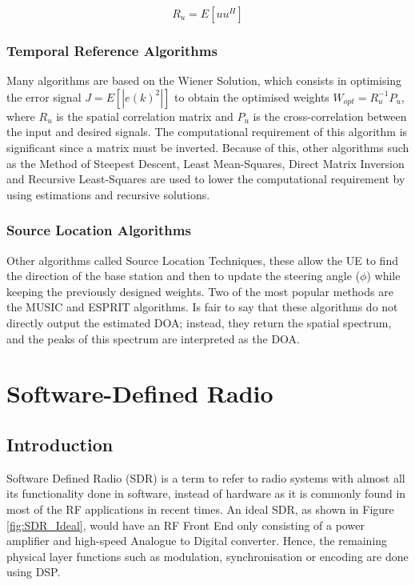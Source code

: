 \documentclass[12pt,a4paper]{report}
\begin{document}
\begin{equation}
    \label{adpt:scm}
    R_{u} = E[uu^{H}]
\end{equation}

\subsubsection{Temporal Reference Algorithms} \label{back:bf:adapt:tr}
Many algorithms are based on the Wiener Solution, which consists in optimising the error signal $J = E[|e(k)^{2}|]$ to obtain the optimised weights $W_{opt}=R_{u}^{-1}P_{u}$, where $R_{u}$ is the spatial correlation matrix and $P_{u}$ is the cross-correlation between the input and desired signals. The computational requirement of this algorithm is significant since a matrix must be inverted. Because of this, other algorithms such as the Method of Steepest Descent, Least Mean-Squares, Direct Matrix Inversion and Recursive Least-Squares are used to lower the computational requirement by using estimations and recursive solutions. \cite{Allen2005}

\subsubsection{Source Location Algorithms} \label{back:bf:adapt:sl}
Other algorithms called Source Location Techniques, these allow the UE to find the direction of the base station and then to update the steering angle ($\phi$) while keeping the previously designed weights. Two of the most popular methods are the MUSIC and ESPRIT algorithms. Is fair to say that these algorithms do not directly output the estimated DOA; instead, they return the spatial spectrum, and the peaks of this spectrum are interpreted as the DOA. \cite{Allen2005}


\newpage
\section{Software-Defined Radio} \label{back:sdr}
\subsection{Introduction} \label{back:sdr:intro}
Software Defined Radio (SDR) is a term to refer to radio systems with almost all its functionality done in software, instead of hardware as it is commonly found in most of the RF applications in recent times. An ideal SDR, as shown in Figure \ref{fig:SDR_Ideal}, would have an RF Front End only consisting of a power amplifier and high-speed Analogue to Digital converter. Hence, the remaining physical layer functions such as modulation, synchronisation or encoding are done using DSP. \cite{Stewart}
\end{document}

